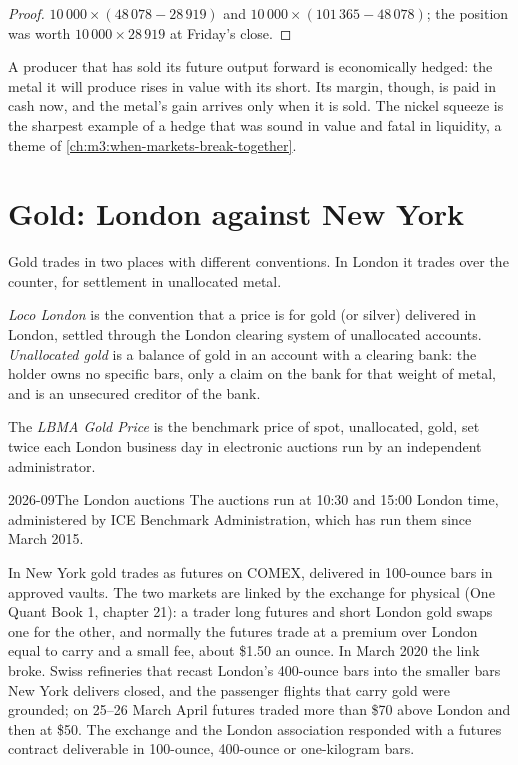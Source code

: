 \begin{proof}
$10\,000 \times (48\,078 - 28\,919)$ and $10\,000 \times (101\,365 - 48\,078)$; the position was
worth $10\,000 \times 28\,919$ at Friday's close.
\end{proof}

A producer that has sold its future output forward is economically hedged: the metal it will
produce rises in value with its short. Its margin, though, is paid in cash now, and the metal's
gain arrives only when it is sold. The nickel squeeze is the sharpest example of a hedge that
was sound in value and fatal in liquidity, a theme of \cref{ch:m3:when-markets-break-together}.

\section{Gold: London against New York}

Gold trades in two places with different conventions. In London it trades over the counter,
for settlement in unallocated metal.

\begin{definition}\label{def:m3:metals:loco}
\emph{Loco London} is the convention that a price is for gold (or silver)
delivered in London, settled through the London clearing system of unallocated accounts.
\emph{Unallocated gold} is a balance of gold in an account with a clearing
bank: the holder owns no specific bars, only a claim on the bank for that weight of metal, and
is an unsecured creditor of the bank.
\end{definition}

\begin{definition}\label{def:m3:metals:lbma}
The \emph{LBMA Gold Price} is the benchmark price of spot, unallocated,
 gold, set twice each London business day in electronic auctions run by an
independent administrator.
\end{definition}

\begin{dated}{2026-09}{The London auctions}\label{dat:m3:metals:lbma}
The  auctions run at 10:30 and 15:00 London time, administered by ICE Benchmark
Administration, which has run them since March 2015.
\end{dated}

In New York gold trades as futures on COMEX, delivered in 100-ounce bars in approved vaults. The
two markets are linked by the exchange for physical (One Quant Book 1, chapter 21): a trader long
futures and short London gold swaps one for the other, and normally the futures trade at a
premium over London equal to carry and a small fee, about \$1.50 an ounce. In March 2020 the link
broke. Swiss refineries that recast London's 400-ounce bars into the smaller bars New York
delivers closed, and the passenger flights that carry gold were grounded; on 25--26 March April
futures traded more than \$70 above London and then at \$50. The exchange and the London
association responded with a futures contract deliverable in 100-ounce, 400-ounce or one-kilogram
bars.

